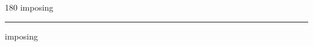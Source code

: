 
\begin{frame}
\begin{center}
\begin{turn}{180}
{\fontsize{2.5cm}{1em}\selectfont imposing}
\end{turn}
\vspace{1em}\par  
\hrule
\vspace{1em}\par  
{\fontsize{2.5cm}{1em}\selectfont imposing}
\end{center}
\end{frame}
